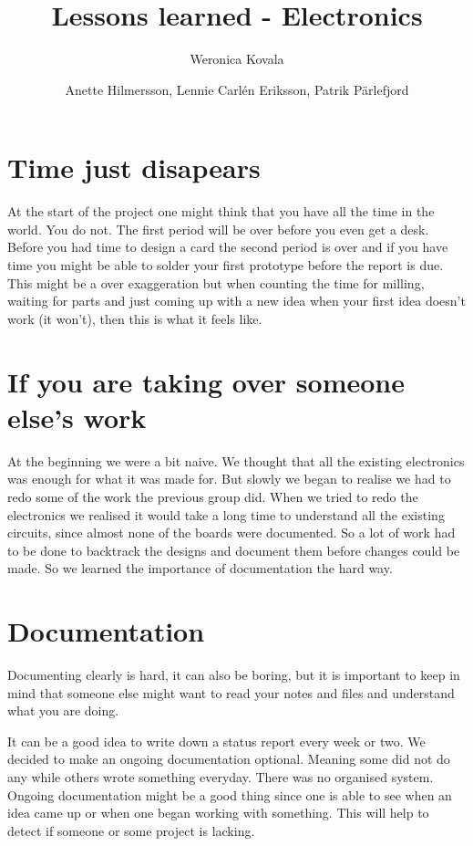 \documentclass[12pt,a4paper]{article}
\author{Weronica Kovala}
\title{Lessons learned - Electronics}
\author{Anette Hilmersson, Lennie Carl\'en Eriksson, Patrik P\"{a}rlefjord}    					%
\begin{document}
\maketitle
\section{Time just disapears}
At the start of the project one might think that you have all the time in the world. You do not. The first period will be over before you even get a desk. Before you had time to design a card the second period is over and if you have time you might be able to solder your first prototype before the report is due. This might be a over exaggeration but when counting the time for milling, waiting for parts and just coming up with a new idea when your first idea doesn't work (it won't), then this is what it feels like. 

\section{If you are taking over someone else's work}
At the beginning we were a bit naive. We thought that all the existing electronics was enough for what it was made for. But slowly we began to realise we had to redo some of the work the previous group did. When we tried to redo the electronics we realised it would take a long time to understand all the existing circuits, since almost none of the boards were documented. So a lot of work had to be done to backtrack the designs and document them before changes could be made. So we learned the importance of documentation the hard way. 

\section{Documentation}
Documenting clearly is hard, it can also be boring, but it is important to keep in mind that someone else might want to read your notes and files and understand what you are doing. 

It can be a good idea to write down a status report every week or two. We decided to make an ongoing documentation optional. Meaning some did not do any while others wrote something everyday. There was no organised system. Ongoing documentation might be a good thing since one is able to see when an idea came up or when one began working with something. This will help to detect if someone or some project is lacking. 
\end{document}
